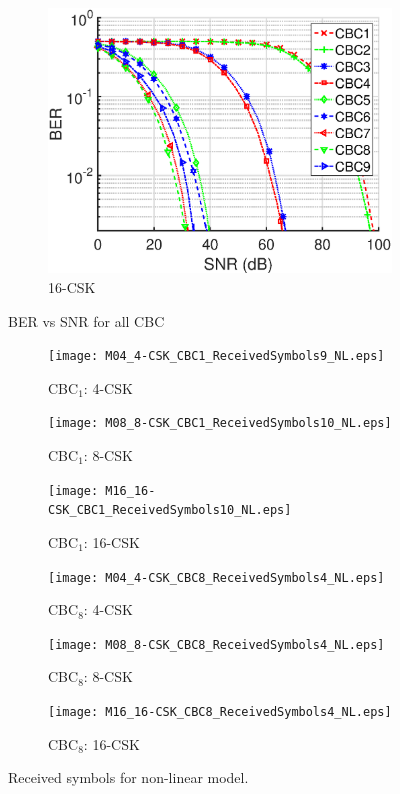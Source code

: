 \documentclass[10pt,letterpaper]{article}
\begin{document}
\begin{figure}[t]
\begin{subfigure}{0.32\textwidth}
		\centering
			\includegraphics[trim={0.1in 0.0in 0.5in 0.3in}, clip=true, width=\textwidth]{M16_16-CSK_BERvsSNR_NL.eps}
			\caption{16-CSK}
			\label{fig16SNR_NL}
		\end{subfigure}
	\caption{BER vs SNR for all CBC}
	\label{figBERvsSNR_NL}
\end{figure}

\begin{figure}[b]
	\centering
		\begin{subfigure}{0.32\textwidth}
		\centering
			\texttt{[image: M04\_4-CSK\_CBC1\_ReceivedSymbols9\_NL.eps]}
			\caption{CBC$_{1}$: 4-CSK}
			\label{fig4RcvSym_NL}
		\end{subfigure}
		\begin{subfigure}{0.32\textwidth}
		\centering
			\texttt{[image: M08\_8-CSK\_CBC1\_ReceivedSymbols10\_NL.eps]}
			\caption{CBC$_{1}$: 8-CSK}
			\label{fig8RcvSym_NL}
		\end{subfigure}
		\begin{subfigure}{0.32\textwidth}
		\centering
			\texttt{[image: M16\_16-CSK\_CBC1\_ReceivedSymbols10\_NL.eps]}
			\caption{CBC$_{1}$: 16-CSK}
			\label{fig16RcvSym_NL}
		\end{subfigure}
		\begin{subfigure}{0.32\textwidth}
		\centering
			\texttt{[image: M04\_4-CSK\_CBC8\_ReceivedSymbols4\_NL.eps]}
			\caption{CBC$_{8}$: 4-CSK}
			\label{fig4RcvSym_NL8}
		\end{subfigure}
		\begin{subfigure}{0.32\textwidth}
		\centering
			\texttt{[image: M08\_8-CSK\_CBC8\_ReceivedSymbols4\_NL.eps]}
			\caption{CBC$_{8}$: 8-CSK}
			\label{fig8RcvSym_NL8}
		\end{subfigure}
		\begin{subfigure}{0.32\textwidth}
		\centering
			\texttt{[image: M16\_16-CSK\_CBC8\_ReceivedSymbols4\_NL.eps]}
			\caption{CBC$_{8}$: 16-CSK}
			\label{fig16RcvSym_NL8}
		\end{subfigure}
	\caption{Received symbols for non-linear model.}
	\label{figRcvSym_NL}
\end{figure}
\end{document}
